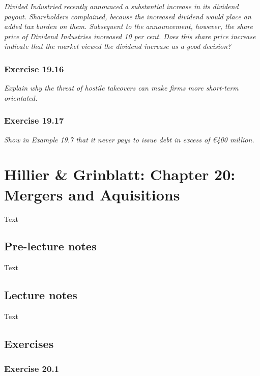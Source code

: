 \documentclass[]{book}
\newcommand{\euro}{€}
\theoremstyle{definition}
\theoremstyle{definition}
\theoremstyle{remark}
\begin{document}
\emph{Divided Industried recently announced a substantial increase in
its dividend payout. Shareholders complained, because the increased
dividend would place an added tax burden on them. Subsequent to the
announcement, however, the share price of Dividend Industries increased
10 per cent. Does this share price increase indicate that the market
viewed the dividend increase as a good decision?} \citep[p.642]{book}

\subsection{Exercise 19.16}\label{exercise-19.16}

\emph{Explain why the threat of hostile takeovers can make firms more
short-term orientated.} \citep[p.642]{book}

\subsection{Exercise 19.17}\label{exercise-19.17}

\emph{Show in Example 19.7 that it never pays to issue debt in excess of
\euro{}400 million.} \citep[p.642]{book}

\chapter{Hillier \& Grinblatt: Chapter 20: Mergers and
Aquisitions}\label{hillier-grinblatt-chapter-20-mergers-and-aquisitions}

Text

\section{Pre-lecture notes}\label{pre-lecture-notes-20}

Text

\section{Lecture notes}\label{lecture-notes-20}

Text

\section{Exercises}\label{exercises-20}

\subsection{Exercise 20.1}\label{exercise-20.1}
\end{document}
